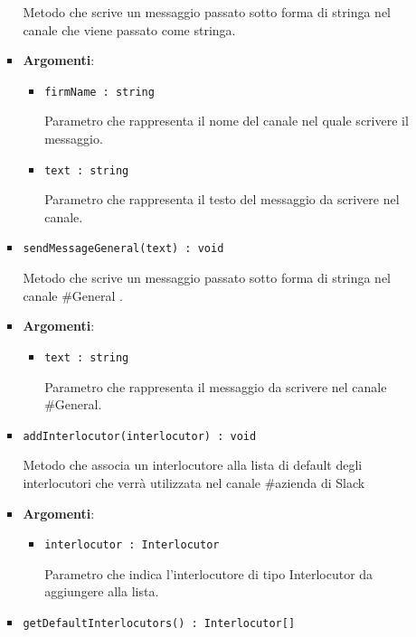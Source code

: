 \documentclass[../DefinizioneDiProdotto.tex]{subfiles}
\begin{document}
\begin{itemize}
\begin{itemize}
\begin{itemize}
	 Metodo che scrive un messaggio passato sotto forma di stringa nel canale che viene passato come stringa.

	\item \textbf{Argomenti}:
	\begin{itemize}
	\item \texttt{firmName : string}\

	 Parametro che rappresenta il nome del canale nel quale scrivere il messaggio.
	\item \texttt{text : string}\

	 Parametro che rappresenta il testo del messaggio da scrivere nel canale.
	\end{itemize}
	\end{itemize}\vspace{0.5em}
	\begin{itemize}
	\item \texttt{sendMessageGeneral(text) : void}\

	 Metodo che scrive un messaggio passato sotto forma di stringa nel canale \#General .

	\item \textbf{Argomenti}:
	\begin{itemize}
	\item \texttt{text : string}\

	 Parametro che rappresenta il messaggio da scrivere nel canale \#General.
	\end{itemize}
	\end{itemize}\vspace{0.5em}
	\begin{itemize}
	\item \texttt{addInterlocutor(interlocutor) : void}\

	 Metodo che associa un interlocutore alla lista di default degli interlocutori che verrà utilizzata nel canale \#azienda di Slack

	\item \textbf{Argomenti}:
	\begin{itemize}
	\item \texttt{interlocutor : Interlocutor}\

	 Parametro che indica l'interlocutore di tipo Interlocutor da aggiungere alla lista.
	\end{itemize}
	\end{itemize}\vspace{0.5em}
	\begin{itemize}
	\item \texttt{getDefaultInterlocutors() : Interlocutor[]}\


\end{itemize}
\end{itemize}
\end{itemize}
\end{document}
